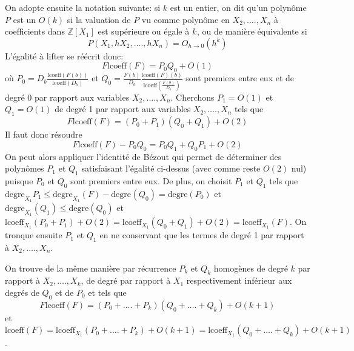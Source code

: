 \documentclass[a4paper,11pt]{article}
\begin{document}
On adopte ensuite la notation suivante: si $k$ est un entier, on dit qu'un
polynôme $P$ est un $O ( k )$ si la valuation de $P$ vu comme polynôme en
$X_2, \ldots ., X_n$ à coefficients dans $\mathbb{Z} [ X_1 ]$ est supérieure
ou égale à $k^{}$, ou de manière équivalente si
\[ P ( X_1, h X_2, \ldots ., h X_n ) = O_{h \rightarrow 0} ( h^k ) \]
L'égalité à lifter se réécrit donc:
\[ F \mbox{lcoeff} ( F ) = P_0 Q_0 + O ( 1 ) \] 
où $P_0 =$$D_b  \frac{\mbox{lcoeff} ( F ( b ))}{\mbox{lcoeff} ( D_b )}$ et
$Q_0 = \frac{F ( b )}{D_b}  \frac{\mbox{lcoeff} ( F ) ( b )}{\mbox{lcoeff} (
\frac{F ( b )}{D_b} )}$ sont premiers entre eux et de degré 0 par rapport aux
variables $X_2, \ldots ., X_n$. Cherchons $P_1 = O ( 1 )$ et $Q_1 = O ( 1 )$
de degré 1 par rapport aux variables $X_2, \ldots ., X_n$ tels que
\[ F \mbox{lcoeff} ( F ) = ( P_0 + P_1 ) ( Q_0 + Q_1 ) + O ( 2 ) \]
Il faut donc résoudre
\[ F \mbox{lcoeff} ( F ) - P_0 Q_0 = P_0 Q_1 + Q_0 P_1 + O ( 2 ) \]
On peut alors appliquer l'identité de Bézout qui permet de déterminer des
polynômes $P_1$ et $Q_1$ satisfaisant l'égalité ci-dessus (avec comme reste $O
( 2 )$ nul) puisque $P_0$ et $Q_0$ sont premiers entre eux. De plus, on
choisit $P_1$ et $Q_1$ tels que $\mbox{degre}_{X_1} P_1 \leqslant
\mbox{degre}_{X_1} ( F ) - \mbox{degre}_{} ( Q_0 ) = \mbox{degre} ( P_0 )$ et
$\mbox{degre}_{X_1} ( Q_1 ) \leqslant \mbox{degre} ( Q_0 )$ et
$\mbox{lcoeff}_{X_1} ( P_0 + P_1 ) + O ( 2 ) = \mbox{lcoeff}_{X_1} ( Q_0 + Q_1
) + O ( 2 ) = \mbox{lcoeff}_{X_1} ( F )$. On tronque ensuite $P_1$ et $Q_1$ en
ne conservant que les termes de degré 1 par rapport à $X_2, \ldots ., X_n$.

On trouve de la même manière par récurrence $P_k$ et $Q_k$ homogènes de degré
$k$ par rapport à $X_2, \ldots ., X_k$, de degré par rapport à $X_1$
respectivement inférieur aux degrés de $Q_0$ et de $P_0$ et tels que
\begin{equation}
  F \mbox{lcoeff} ( F ) = ( P_0 + \ldots . + P_k ) ( Q_0 + \ldots . + Q_k ) +
  O ( k + 1  ) \label{ezgcd}
\end{equation}
et $\mbox{lcoeff} ( F ) = \mbox{lcoeff}_{X_1} ( P_0 + \ldots . + P_k ) + O ( k
+ 1 ) = \mbox{lcoeff}_{X_1} ( Q_0 + \ldots . + Q_k ) + O ( k + 1 )$.
\end{document}
